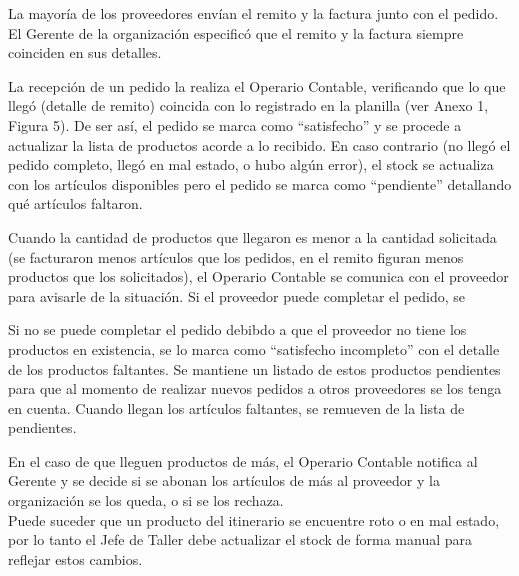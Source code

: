 \documentclass[12pt]{extarticle}
\begin{document}
\begin{spacing}{1.2}

    La mayoría de los proveedores envían el remito y la factura junto con el pedido. El Gerente de la organización especificó que el remito y la factura siempre coinciden en sus detalles. 
    
    La recepción de un pedido la realiza el Operario Contable, verificando que lo que llegó (detalle de remito) coincida con lo registrado en la planilla (ver Anexo 1, Figura 5). De ser así, el pedido se marca como ``satisfecho'' y se procede a actualizar la lista de productos acorde a lo recibido. En caso contrario (no llegó el pedido completo, llegó en mal estado, o hubo algún error), el stock se actualiza con los artículos disponibles pero el pedido se marca como ``pendiente'' detallando qué artículos faltaron. 

    Cuando la cantidad de productos que llegaron es menor a la cantidad solicitada (se facturaron menos artículos que los pedidos, en el remito figuran menos productos que los solicitados), el Operario Contable se comunica con el proveedor para avisarle de la situación. Si el proveedor puede completar el pedido, se  



    Si no se puede completar el pedido debibdo a que el proveedor no tiene los productos en existencia, se lo marca como ``satisfecho incompleto'' con el detalle de los productos faltantes. Se mantiene un listado de estos productos pendientes para que al momento de realizar nuevos pedidos a otros proveedores se los tenga en cuenta. Cuando llegan los artículos faltantes, se remueven de la lista de pendientes.

    En el caso de que lleguen productos de más, el Operario Contable notifica al Gerente y se decide si se abonan los artículos de más al proveedor y la organización se los queda, o si se los rechaza.\\

    Puede suceder que un producto del itinerario se encuentre roto o en mal estado, por lo tanto el Jefe de Taller debe actualizar el stock de forma manual para reflejar estos cambios.


\end{spacing}
\end{document}
